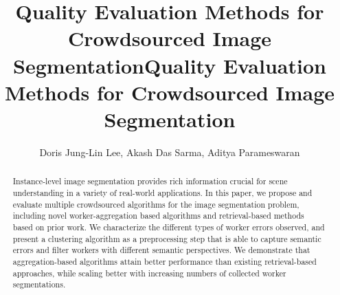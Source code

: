 \documentclass[letterpaper]{article} %
\title{Quality Evaluation Methods for Crowdsourced Image Segmentation}
\begin{document}
           \title{Quality Evaluation Methods for Crowdsourced Image Segmentation}
           \author{Doris Jung-Lin Lee, Akash Das Sarma, Aditya Parameswaran}
           \maketitle
           \begin{abstract}
           Instance-level image segmentation provides rich information crucial for scene understanding in a variety of real-world applications. In this paper, we propose and evaluate multiple crowdsourced algorithms for the image segmentation problem, including novel worker-aggregation based algorithms and retrieval-based methods based on prior work. We characterize the different types of worker errors observed, and present a clustering algorithm as a preprocessing step that is able to capture semantic errors and filter workers with different semantic perspectives. We demonstrate that aggregation-based algorithms attain better performance than existing retrieval-based approaches, while scaling better with increasing numbers of collected worker segmentations. 
           \vspace{-10pt}
          \end{abstract}
               
          
          
          
          
          
          
          


\end{document}
